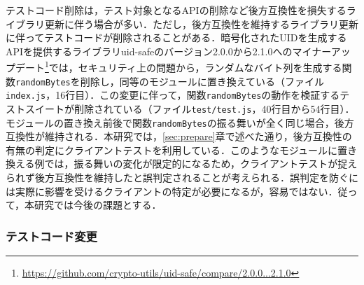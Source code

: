 \documentclass[submit]{ipsj}
\begin{document}
テストコード削除は，テスト対象となるAPIの削除など後方互換性を損失するライブラリ更新に伴う場合が多い．ただし，後方互換性を維持するライブラリ更新に伴ってテストコードが削除されることがある．暗号化されたUIDを生成するAPIを提供するライブラリuid-safeのバージョン2.0.0から2.1.0へのマイナーアップデート\footnote{\url{https://github.com/crypto-utils/uid-safe/compare/2.0.0...2.1.0}}では，セキュリティ上の問題から，ランダムなバイト列を生成する関数{\verb|randomBytes|}を削除し，同等のモジュールに置き換えている（ファイル\verb|index.js|，16行目）．この変更に伴って，関数{\verb|randomBytes|}の動作を検証するテストスイートが削除されている（ファイル\verb|test/test.js|，40行目から54行目）．モジュールの置き換え前後で関数{\verb|randomBytes|}の振る舞いが全く同じ場合，後方互換性が維持される．本研究では，\ref{sec:prepare}章で述べた通り，後方互換性の有無の判定にクライアントテストを利用している．このようなモジュールに置き換える例では，振る舞いの変化が限定的になるため，クライアントテストが捉えられず後方互換性を維持したと誤判定されることが考えられる．誤判定を防ぐには実際に影響を受けるクライアントの特定が必要になるが，容易ではない\cite{detecting-locations-in-js}．従って，本研究では今後の課題とする．

\subsubsection{テストコード変更}\label{subsec:change-test}




\end{document}
